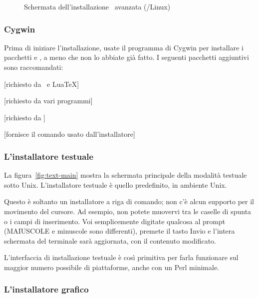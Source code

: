 \documentclass{article}
\begin{document}
\begin{figure}[tb]
\caption{Schermata dell'installazione \GUI\ avanzata
  (\GNU/Linux)}\label{fig:advanced-lnx}
\end{figure}


\subsubsection{Cygwin}
\label{sec:cygwin}

Prima di iniziare l'installazione, usate il programma 
di Cygwin per installare i pacchetti  e , a
meno che non lo abbiate già fatto. I seguenti pacchetti aggiuntivi sono
raccomandati:
\begin{itemize*}
\item {} [richiesto da \XeTeX\ e Lua\TeX]
\item {} [richiesto da vari programmi]
\item {} [richiesto da ]
\item {} [fornisce il comando  usato
  dall'installatore]
\end{itemize*}

\subsubsection{L'installatore testuale}

La figura~\ref{fig:text-main} mostra la schermata principale della
modalità testuale sotto Unix. L'installatore testuale è quello
predefinito, in ambiente Unix.

Questo è soltanto un installatore a riga di comando; non c'è alcun
supporto per il movimento del cursore. Ad esempio, non
potete muovervi tra le caselle di spunta o i campi di inserimento.
Voi semplicemente digitate qualcosa al prompt (MAIUSCOLE e minuscole sono
differenti), premete il tasto Invio e l'intera schermata del terminale
sarà aggiornata, con il contenuto modificato.

L'interfaccia di installazione testuale è così primitiva per farla
funzionare sul maggior numero possibile di piattaforme, anche con un Perl
minimale.

\subsubsection{L'installatore grafico}
\label{sec:graphical-inst}
\end{document}
